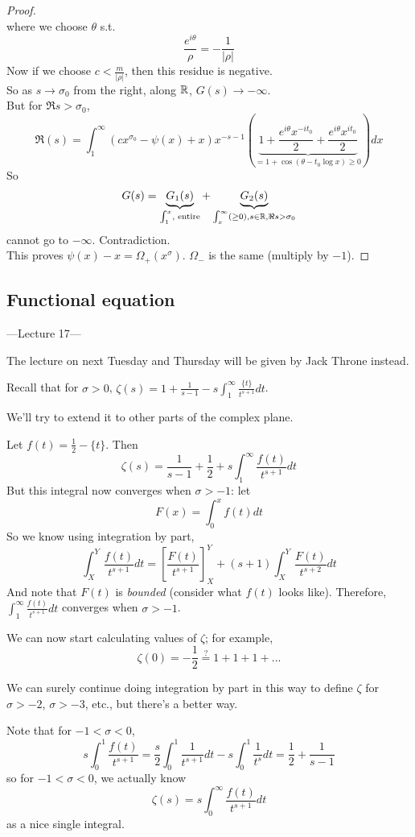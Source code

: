 \documentclass[a4paper]{article}
\begin{document}
\begin{thm}
\begin{proof}
\[\]
where we choose $\theta$ s.t. 
\[
\frac{e^{i\theta}}{\rho} = -\frac{1}{|\rho|}
\]
Now if we choose $c<\frac{m}{|\rho|}$, then this residue is negative.\\
So as $s \to \sigma_0$ from the right, along $\mathbb{R}$, $G(s) \to -\infty$.\\
But for $\Re s > \sigma_0$,
\[
\Re(s) = \int_1^\infty (cx^{\sigma_0}-\psi(x)+x)x^{-s-1}\left(\underbrace{1+\frac{e^{i\theta}x^{-it_0}}{2} + \frac{e^{i\theta}x^{it_0}}{2}}_{=1+\cos(\theta-t_0\log x) \geq 0}\right) dx
\]
So
\[
G(s) = \underbrace{G_1(s)}_{\int_1^x, \text{ entire}} + \underbrace{G_2(s)}_{\int_x^\infty (\geq 0), s \in \mathbb{R}, \Re s > \sigma_0}
\]
cannot go to $-\infty$. Contradiction.\\
This proves $\psi(x)-x = \Omega_+(x^\sigma)$. $\Omega_-$ is the same (multiply by $-1$).
\end{proof}
\end{thm}

\subsection{Functional equation}

---Lecture 17---

The lecture on next Tuesday and Thursday will be given by Jack Throne instead.

Recall that for $\sigma > 0$, $\zeta(s) = 1+\frac{1}{s-1} - s\int_1^\infty \frac{\{t\}}{t^{s+1}} dt$.

We'll try to extend it to other parts of the complex plane.

Let $f(t) = \frac{1}{2}-\{t\}$. Then
\[
\zeta(s) = \frac{1}{s-1} + \frac{1}{2} + s\int_1^\infty \frac{f(t)}{t^{s+1}} dt
\]
But this integral now converges when $\sigma > -1$: let
\[
F(x) = \int_0^x f(t) dt
\]
So we know using integration by part,
\[
\int_X^Y \frac{f(t)}{t^{s+1}} dt = \left[\frac{F(t)}{t^{s+1}}\right]_X^Y + (s+1) \int_X^Y \frac{F(t)}{t^{s+2}} dt
\]
And note that $F(t)$ is \emph{bounded} (consider what $f(t)$ looks like). Therefore, $\int_1^\infty \frac{f(t)}{t^{s+1}} dt$ converges when $\sigma > -1$.

We can now start calculating values of $\zeta$; for example,
\[
\zeta(0) = -\frac{1}{2} \stackrel{?}{=} 1+1+1+...
\]

We can surely continue doing integration by part in this way to define $\zeta$ for $\sigma>-2$, $\sigma>-3$, etc., but there's a better way.

Note that for $-1<\sigma<0$,
\[
s\int_0^1 \frac{f(t)}{t^{s+1}} = \frac{s}{2} \int_0^1 \frac{1}{t^{s+1}} dt - s \int_0^1 \frac{1}{t^s} dt = \frac{1}{2} + \frac{1}{s-1}
\]
so for $-1 < \sigma < 0$, we actually know
\[
\zeta(s) = s\int_0^\infty \frac{f(t)}{t^{s+1}} dt
\]
as a nice single integral.
\end{document}
